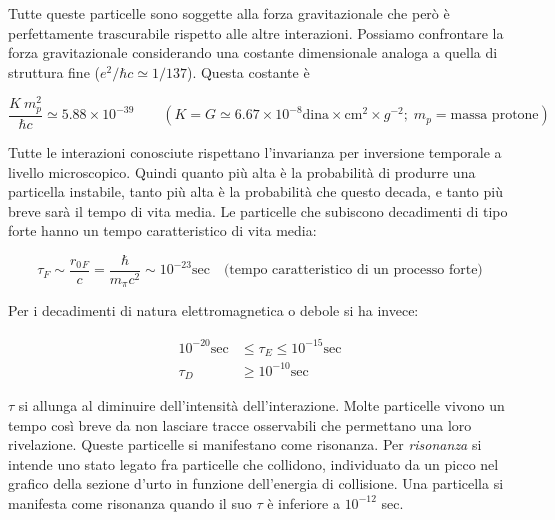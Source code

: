 Tutte queste particelle sono soggette alla forza gravitazionale che però è
perfettamente trascurabile rispetto alle altre interazioni. Possiamo confrontare
la forza gravitazionale considerando una costante dimensionale analoga a quella
di struttura fine ($e^2/\hbar c \simeq 1/137$). Questa costante è

\begin{equation*}
\dfrac{K \ m^2_p}{\hbar c} \simeq 5.88 \times 10^{-39} \qquad (K = G \simeq 6.67
\times 10^{-8} \text{dina} \times \text{cm}^2 \times g^{-2};\; m_p = \text{massa
protone})
\end{equation*}

Tutte le interazioni conosciute rispettano l'invarianza per inversione temporale
a livello microscopico. Quindi quanto più alta è la probabilità di produrre una
particella instabile, tanto più alta è la probabilità che questo decada, e tanto
più breve sarà il tempo di vita media. Le particelle che subiscono decadimenti
di tipo forte hanno un tempo caratteristico di vita media:

\begin{equation*}
\tau_F \sim \dfrac{r{_0{_F}}}{c} = \dfrac{\hbar}{m_\pi c^2} \sim 10^{-23}
\text{sec} \quad \text{(tempo caratteristico di un processo forte)}
\end{equation*}

Per i decadimenti di natura elettromagnetica o debole si ha invece:

\begin{align*}
  10^{-20} \text{sec} &\le \tau_E \le 10^{-15} \text{sec} \\
  \tau_D &\ge 10^{-10} \text{sec}
\end{align*}

$\tau$ si allunga al diminuire dell'intensità dell'interazione. Molte particelle
vivono un tempo così breve da non lasciare tracce osservabili che permettano una
loro rivelazione. Queste particelle si manifestano come risonanza. Per
\textit{risonanza} si intende uno stato legato fra particelle che collidono,
individuato da un picco nel grafico della sezione d'urto in funzione
dell'energia di collisione. Una particella si manifesta come risonanza quando il
suo $\tau$ è inferiore a $10^{-12}$ sec.

